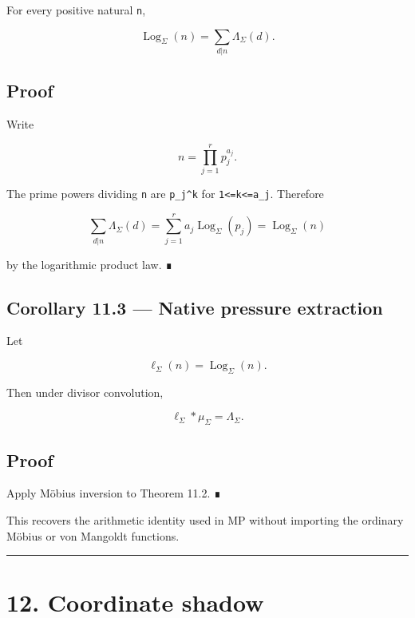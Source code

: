 For every positive natural \texttt{n},

\[
\boxed{
\operatorname{Log}_\Sigma(n)
=
\sum_{d|n}\Lambda_\Sigma(d).
}
\]

\hypertarget{proof-14}{%
\subsection{Proof}\label{proof-14}}

Write

\[
n=\prod_{j=1}^{r}p_j^{a_j}.
\]

The prime powers dividing \texttt{n} are \texttt{p\_j\^{}k} for \texttt{1\textless{}=k\textless{}=a\_j}. Therefore

\[
\sum_{d|n}\Lambda_\Sigma(d)
=
\sum_{j=1}^{r}a_j\operatorname{Log}_\Sigma(p_j)
=
\operatorname{Log}_\Sigma(n)
\]

by the logarithmic product law. ∎

\hypertarget{corollary-11.3-native-pressure-extraction}{%
\subsection{Corollary 11.3 --- Native pressure extraction}\label{corollary-11.3-native-pressure-extraction}}

Let

\[
\ell_\Sigma(n)=\operatorname{Log}_\Sigma(n).
\]

Then under divisor convolution,

\[
\boxed{
\ell_\Sigma*\mu_\Sigma
=
\Lambda_\Sigma.
}
\]

\hypertarget{proof-15}{%
\subsection{Proof}\label{proof-15}}

Apply Möbius inversion to Theorem 11.2. ∎

This recovers the arithmetic identity used in MP without importing the ordinary
Möbius or von Mangoldt functions.

\begin{center}\rule{0.5\linewidth}{0.5pt}\end{center}

\hypertarget{coordinate-shadow}{%
\section{12. Coordinate shadow}\label{coordinate-shadow}}


